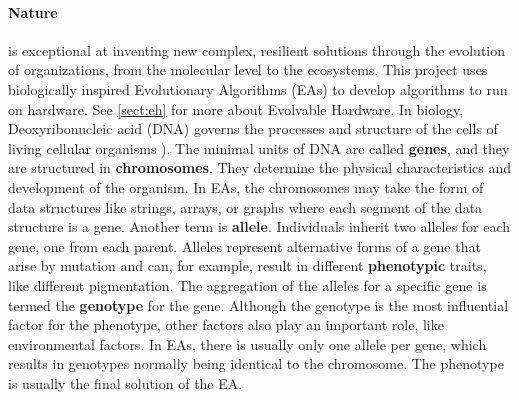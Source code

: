 \paragraph{Nature} is exceptional at inventing new complex, resilient solutions through the evolution of organizations, from the molecular level to the ecosystems.
This project uses biologically inspired Evolutionary Algorithms (EAs) to develop algorithms to run on hardware.
See \vref{sect:eh} for more about Evolvable Hardware.
In biology, Deoxyribonucleic acid (DNA) governs the processes and structure of the cells of living cellular organisms ).
The minimal units of DNA are called \textbf{genes}, and they are structured in \textbf{chromosomes}. They determine the physical characteristics and development of the organism.
In EAs, the chromosomes may take the form of data structures like strings, arrays, or graphs where each segment of the data structure is a gene.
Another term is \textbf{allele}. Individuals inherit two alleles for each gene, one from each parent. Alleles represent alternative forms of a gene that arise by mutation and can, for example, result in different \textbf{phenotypic} traits, like different pigmentation.
The aggregation of the alleles for a specific gene is termed the \textbf{genotype} for the gene.
Although the genotype is the most influential factor for the phenotype, other factors also play an important role, like environmental factors.
\cite{trefzer_evolvable_2015}
In EAs, there is usually only one allele per gene, which results in genotypes normally being identical to the chromosome.
The phenotype is usually the final solution of the EA.

